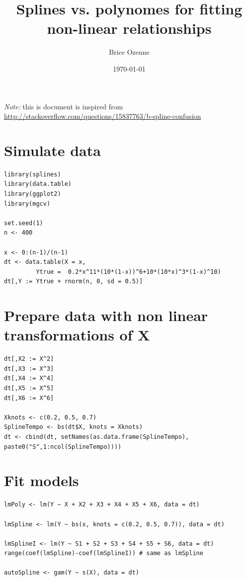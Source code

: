 \documentclass{article}
\author{Brice Ozenne}
\date{\today}
\title{Splines vs. polynomes for fitting non-linear relationships}
\begin{document}
\maketitle
\tableofcontents

\bigskip

\emph{Note:} this is document is inspired from \url{http://stackoverflow.com/questions/15837763/b-spline-confusion}

\clearpage

\section{Simulate data}
\label{sec:org582433f}
\begin{lstlisting}
library(splines)
library(data.table)
library(ggplot2)
library(mgcv)

set.seed(1)
n <- 400

x <- 0:(n-1)/(n-1)
dt <- data.table(X = x,
		 Ytrue =  0.2*x^11*(10*(1-x))^6+10*(10*x)^3*(1-x)^10)
dt[,Y := Ytrue + rnorm(n, 0, sd = 0.5)]
\end{lstlisting}


\section{Prepare data with non linear transformations of X}
\label{sec:orgb92dd9d}
\begin{lstlisting}
dt[,X2 := X^2]
dt[,X3 := X^3]
dt[,X4 := X^4]
dt[,X5 := X^5]
dt[,X6 := X^6]

Xknots <- c(0.2, 0.5, 0.7)
SplineTempo <- bs(dt$X, knots = Xknots)
dt <- cbind(dt, setNames(as.data.frame(SplineTempo), paste0("S",1:ncol(SplineTempo))))
\end{lstlisting}

\clearpage

\section{Fit models}
\label{sec:org038f4c4}
\begin{lstlisting}
lmPoly <- lm(Y ~ X + X2 + X3 + X4 + X5 + X6, data = dt)

lmSpline <- lm(Y ~ bs(x, knots = c(0.2, 0.5, 0.7)), data = dt)

lmSplineI <- lm(Y ~ S1 + S2 + S3 + S4 + S5 + S6, data = dt)
range(coef(lmSpline)-coef(lmSplineI)) # same as lmSpline

autoSpline <- gam(Y ~ s(X), data = dt)
\end{lstlisting}
\end{document}
